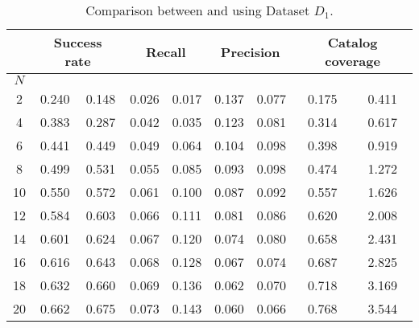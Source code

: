 \begin{table*}[t!]
	\normalsize
\caption{Comparison between \MNB and \TFb using Dataset $D_{1}$.} %
\begin{tabular}{|c| c|c| c|c |c|c |c|c|} \hline
	& \multicolumn{2}{c|}{\textbf{Success rate}} & \multicolumn{2}{c|}{\textbf{Recall}} & \multicolumn{2}{c|}{\textbf{Precision}} & \multicolumn{2}{c|}{ \textbf{Catalog coverage}} \\ \hline
	$N$  & \MNB     & \TF  & \MNB      & \TF   & \MNB       & \TF    & \MNB       & \TF      \\ \hline         
	
2        & 0.240    & 0.148  & 0.026    & 0.017   & 0.137    & 0.077     & 0.175   & 0.411   \\ \hline
4        & 0.383    & 0.287  & 0.042    & 0.035   & 0.123    & 0.081     & 0.314   & 0.617   \\ \hline
\rowcolor{Gray}
6        & 0.441    & 0.449  & 0.049    & 0.064   & 0.104    & 0.098     & 0.398   & 0.919   \\ \hline
8        & 0.499    & 0.531   & 0.055    & 0.085   & 0.093    & 0.098   & 0.474   & 1.272   \\ \hline
10       & 0.550    & 0.572   & 0.061    & 0.100   & 0.087    & 0.092   & 0.557   & 1.626   \\ \hline
12       & 0.584    & 0.603   & 0.066    & 0.111   & 0.081    & 0.086   & 0.620   & 2.008   \\ \hline
14       & 0.601    & 0.624   & 0.067    & 0.120   & 0.074    & 0.080   & 0.658   & 2.431   \\ \hline
16       & 0.616    & 0.643   & 0.068    & 0.128   & 0.067    & 0.074   & 0.687   & 2.825   \\ \hline
18       & 0.632    & 0.660   & 0.069    & 0.136   & 0.062    & 0.070   & 0.718   & 3.169   \\ \hline
20       & 0.662    & 0.675   & 0.073    & 0.143   & 0.060    & 0.066   & 0.768   & 3.544   \\ \hline
\end{tabular}
\label{tab:combined_dt1}
\end{table*}


